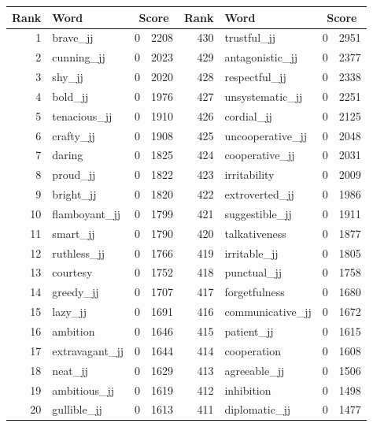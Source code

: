 \begin{table}[tbp]
    \begin{tabular}{| rlr@{.}l | rlr@{.}l |}
    \hline
    \textbf{Rank} & \textbf{Word} & \multicolumn{2}{c|}{\textbf{Score}} & \textbf{Rank} & \textbf{Word} & \multicolumn{2}{c|}{\textbf{Score}} \\
    \hline
    1 & brave\_jj & 0 & 2208    &    430 & trustful\_jj & 0 & 2951 \\
    2 & cunning\_jj & 0 & 2023    &    429 & antagonistic\_jj & 0 & 2377 \\
    3 & shy\_jj & 0 & 2020    &    428 & respectful\_jj & 0 & 2338 \\
    4 & bold\_jj & 0 & 1976    &    427 & unsystematic\_jj & 0 & 2251 \\
    5 & tenacious\_jj & 0 & 1910    &    426 & cordial\_jj & 0 & 2125 \\
    6 & crafty\_jj & 0 & 1908    &    425 & uncooperative\_jj & 0 & 2048 \\
    7 & daring & 0 & 1825    &    424 & cooperative\_jj & 0 & 2031 \\
    8 & proud\_jj & 0 & 1822    &    423 & irritability & 0 & 2009 \\
    9 & bright\_jj & 0 & 1820    &    422 & extroverted\_jj & 0 & 1986 \\
    10 & flamboyant\_jj & 0 & 1799    &    421 & suggestible\_jj & 0 & 1911 \\
    11 & smart\_jj & 0 & 1790    &    420 & talkativeness & 0 & 1877 \\
    12 & ruthless\_jj & 0 & 1766    &    419 & irritable\_jj & 0 & 1805 \\
    13 & courtesy & 0 & 1752    &    418 & punctual\_jj & 0 & 1758 \\
    14 & greedy\_jj & 0 & 1707    &    417 & forgetfulness & 0 & 1680 \\
    15 & lazy\_jj & 0 & 1691    &    416 & communicative\_jj & 0 & 1672 \\
    16 & ambition & 0 & 1646    &    415 & patient\_jj & 0 & 1615 \\
    17 & extravagant\_jj & 0 & 1644    &    414 & cooperation & 0 & 1608 \\
    18 & neat\_jj & 0 & 1629    &    413 & agreeable\_jj & 0 & 1506 \\
    19 & ambitious\_jj & 0 & 1619    &    412 & inhibition & 0 & 1498 \\
    20 & gullible\_jj & 0 & 1613    &    411 & diplomatic\_jj & 0 & 1477 \\

\end{tabular}
\end{table}
